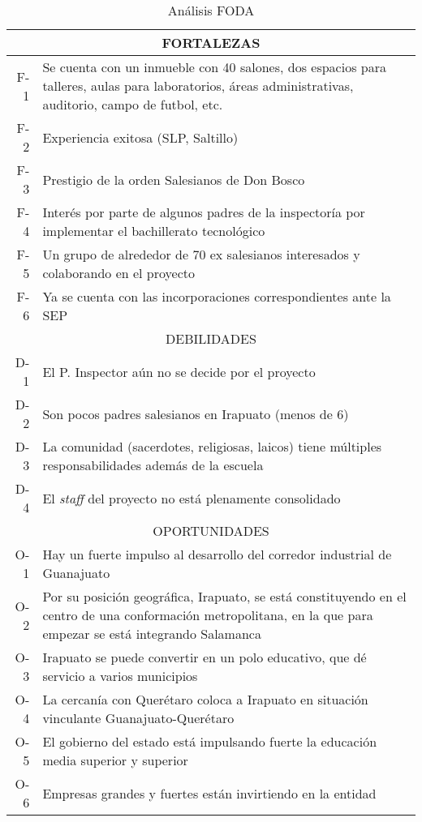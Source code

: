 \begin{table}[h!]
    \centering
    \caption{Análisis FODA}
    \label{tbl:Foda}
    \footnotesize
    \begin{tabular}{r|p{5in}}
    	\multicolumn{2}{c}{FORTALEZAS} \\
    	\hline
    	\hline
    	F-1 & Se cuenta con un inmueble con 40 salones, dos espacios para talleres, aulas para laboratorios, áreas administrativas, auditorio, campo de futbol, etc. \\
    	F-2 & Experiencia exitosa (SLP, Saltillo) \\
    	F-3 & Prestigio de la orden Salesianos de Don Bosco \\
    	F-4 & Interés por parte de algunos padres de la inspectoría por implementar el bachillerato tecnológico \\
    	F-5 & Un grupo de alrededor de 70 ex salesianos interesados y colaborando en el proyecto \\
    	F-6 & Ya se cuenta con las incorporaciones correspondientes ante la SEP \\
    	\hline
    	\multicolumn{2}{c}{DEBILIDADES} \\
    	\hline
    	\hline
    	D-1 & El P. Inspector aún no se decide por el proyecto \\
    	D-2 & Son pocos padres salesianos en Irapuato (menos de 6) \\
    	D-3 & La comunidad (sacerdotes, religiosas, laicos) tiene múltiples responsabilidades además de la escuela \\
    	D-4 & El \emph{staff} del proyecto no est\'a plenamente consolidado \\
    	\hline
    	\multicolumn{2}{c}{OPORTUNIDADES} \\
    	\hline
    	\hline
    	O-1 & Hay un fuerte impulso al desarrollo del corredor industrial de Guanajuato \\
    	O-2 & Por su posición geográfica, Irapuato, se está constituyendo en el centro de una conformación metropolitana, en la que para empezar se está integrando Salamanca \\
    	O-3 & Irapuato se puede convertir en un polo educativo, que dé servicio a varios municipios \\
    	O-4 & La cercanía con Querétaro coloca a Irapuato en situación vinculante Guanajuato-Querétaro \\
    	O-5 & El gobierno del estado está impulsando fuerte la educación media superior y superior \\
    	O-6 & Empresas grandes y fuertes están invirtiendo en la entidad \\

\end{tabular}
\end{table}
